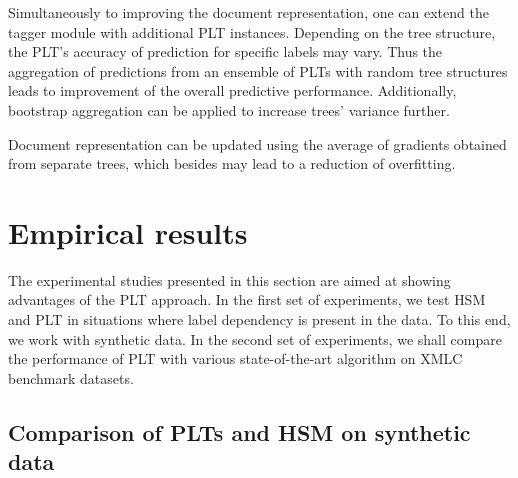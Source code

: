 \documentclass{article}
\newcommand{\Algo}[1]{\textsc{#1}}
\newcommand{\sectionBefore}{-0pt}
\newcommand{\sectionAfter}{-0pt}
\begin{document}
Simultaneously to improving the document representation, one can extend the tagger module with additional PLT instances.
Depending on the tree structure, the PLT's accuracy of prediction for specific labels may vary.
Thus the aggregation of predictions from an ensemble of PLTs with random tree structures leads to improvement of the overall predictive performance.
Additionally, bootstrap aggregation can be applied to increase trees' variance further.

Document representation can be updated using %
the average of gradients obtained from separate trees, which besides may lead to a reduction of overfitting.



\vspace{\sectionBefore}
\section{Empirical results}
\label{sec:empirical_results}
\vspace{\sectionAfter}

The experimental studies presented in this section are aimed at showing advantages of the PLT approach. In the first set of experiments, we test \Algo{HSM} and \Algo{PLT} in situations where label dependency is present in the data. To this end, we work with synthetic data. In the second set of experiments, we shall compare the performance of PLT with various state-of-the-art algorithm on XMLC benchmark datasets.


\subsection{Comparison of PLTs and HSM on synthetic data}
\label{sec:empirical-synthetic}
\end{document}
